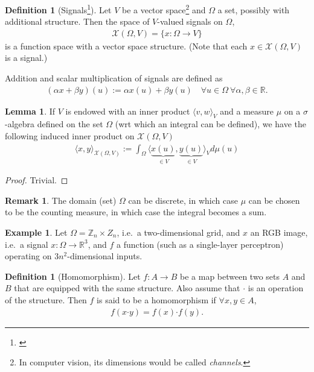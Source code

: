 \documentclass[12pt, a4paper]{article}
\numberwithin{equation}{section}
\theoremstyle{definition}
\theoremstyle{definition}
\newtheorem{defn}[thm]{Definition} %
\newtheorem{exmp}[thm]{Example} %
\newtheorem{lemma}[thm]{Lemma} %
\newtheorem{remark}[thm]{Remark} %
\begin{document}
	\begin{defn}[Signals\footnote{\cite[p.~11]{bronstein2021geometric}}] 
		Let $V$ be a vector space\footnote{In computer vision, its dimensions would be called \textit{channels}.} and $\Omega$ a set, possibly with additional structure. Then the space of $V$-valued signals on $\Omega$,
		\begin{align}
			\mathcal X(\Omega, V) = \{ x: \Omega \rightarrow V \}
		\end{align}
		is a function space with a vector space structure. (Note that each $x\in \mathcal X(\Omega, V)$ is a signal.)
		
		Addition and scalar multiplication of signals are defined as 
		\begin{align}
			(\alpha x + \beta y)(u) := \alpha x(u) + \beta y(u) \quad \forall u\in\Omega\ \forall \alpha, \beta\in \mathbb R.
		\end{align}
	\end{defn}

	\begin{lemma}
		If $V$ is endowed with an inner product $\langle v, w\rangle_{V}$ and a measure $\mu$ on a $\sigma$-algebra defined on the set $\Omega$ (wrt which an integral can be defined), we have the following induced inner product on $\mathcal X(\Omega, V)$
		\begin{align}
			\langle x, y\rangle_{\mathcal X(\Omega, V)} := \int_{\Omega}\langle \underbrace{x(u)}_{\in V}, \underbrace{y(u)}_{\in V}\rangle_{V}d\mu(u)
		\end{align}
	\end{lemma}

	\begin{proof}
		Trivial.
	\end{proof}

	\begin{remark}
		The domain (set) $\Omega$ can be discrete, in which case $\mu$ can be chosen to be the counting measure, in which case the integral becomes a sum.
	\end{remark}

	\begin{exmp}
		Let $\Omega = \mathbb Z_{n}\times Z_{n}$, i.e.~a two-dimensional grid, and $x$ an RGB image, i.e.~a signal $x:\Omega\rightarrow \mathbb R^3$, and $f$ a function (such as a single-layer perceptron) operating on $3n^2$-dimensional inputs.
	\end{exmp}
	
	\begin{defn}[Homomorphism]
		Let $f:A\rightarrow B$ be a map between two sets $A$ and $B$ that are equipped with the same structure. Also assume that $\bm{\cdot}$ is an operation of the structure. Then $f$ is said to be a homomorphism if $\forall x, y\in A$,
		\begin{align}
			f(x\bm{\cdot} y) = f(x) \bm{\cdot} f(y).
		\end{align}
	\end{defn}
	
\end{document}
